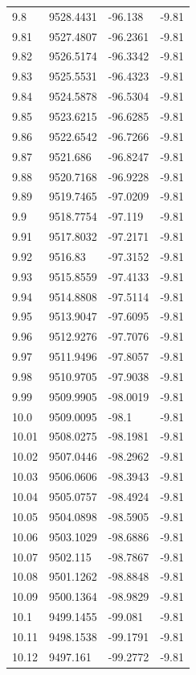 \begin{table}[H]
\begin{tabular}{llll}
9.8 & 9528.4431 & -96.138 & -9.81 \\
9.81 & 9527.4807 & -96.2361 & -9.81 \\
9.82 & 9526.5174 & -96.3342 & -9.81 \\
9.83 & 9525.5531 & -96.4323 & -9.81 \\
9.84 & 9524.5878 & -96.5304 & -9.81 \\
9.85 & 9523.6215 & -96.6285 & -9.81 \\
9.86 & 9522.6542 & -96.7266 & -9.81 \\
9.87 & 9521.686 & -96.8247 & -9.81 \\
9.88 & 9520.7168 & -96.9228 & -9.81 \\
9.89 & 9519.7465 & -97.0209 & -9.81 \\
9.9 & 9518.7754 & -97.119 & -9.81 \\
9.91 & 9517.8032 & -97.2171 & -9.81 \\
9.92 & 9516.83 & -97.3152 & -9.81 \\
9.93 & 9515.8559 & -97.4133 & -9.81 \\
9.94 & 9514.8808 & -97.5114 & -9.81 \\
9.95 & 9513.9047 & -97.6095 & -9.81 \\
9.96 & 9512.9276 & -97.7076 & -9.81 \\
9.97 & 9511.9496 & -97.8057 & -9.81 \\
9.98 & 9510.9705 & -97.9038 & -9.81 \\
9.99 & 9509.9905 & -98.0019 & -9.81 \\
10.0 & 9509.0095 & -98.1 & -9.81 \\
10.01 & 9508.0275 & -98.1981 & -9.81 \\
10.02 & 9507.0446 & -98.2962 & -9.81 \\
10.03 & 9506.0606 & -98.3943 & -9.81 \\
10.04 & 9505.0757 & -98.4924 & -9.81 \\
10.05 & 9504.0898 & -98.5905 & -9.81 \\
10.06 & 9503.1029 & -98.6886 & -9.81 \\
10.07 & 9502.115 & -98.7867 & -9.81 \\
10.08 & 9501.1262 & -98.8848 & -9.81 \\
10.09 & 9500.1364 & -98.9829 & -9.81 \\
10.1 & 9499.1455 & -99.081 & -9.81 \\
10.11 & 9498.1538 & -99.1791 & -9.81 \\
10.12 & 9497.161 & -99.2772 & -9.81 \\

\end{tabular}
\end{table}
